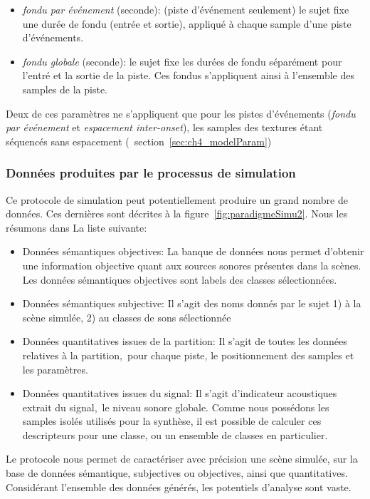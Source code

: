 \begin{itemize}
\item \emph{fondu par événement} (seconde): (piste d'événement seulement) le sujet fixe une durée de fondu (entrée et sortie), appliqué à chaque sample d'une piste d'événements.
\item \emph{fondu globale} (seconde): le sujet fixe les durées de fondu séparément pour l'entré et la sortie de la piste. Ces fondus s'appliquent ainsi à l'ensemble des samples de la piste.
\end{itemize}

Deux de ces paramètres ne s’appliquent que pour les pistes d'événements (\emph{fondu par événement} et \emph{espacement inter-onset}), les samples des textures étant séquencés sans espacement (\cf~section~\ref{sec:ch4_modelParam})

\subsubsection{Données produites par le processus de simulation}

Ce protocole de simulation peut potentiellement produire un grand nombre de données. Ces dernières sont décrites à la figure~\ref{fig:paradigmeSimu2}.  Nous les résumons dans La liste suivante:

\begin{itemize}
\item Données sémantiques objectives: La banque de données nous permet d'obtenir une information objective quant aux sources sonores présentes dans la scènes. Les données sémantiques objectives sont labels des classes sélectionnées.
\item Données sémantiques subjective: Il s'agit des noms donnés par le sujet 1) à la scène simulée, 2) au classes de sons sélectionnée
\item Données quantitatives issues de la partition: Il s'agit de toutes les données relatives à la partition,\ie~pour chaque piste, le positionnement des samples et les paramètres.
\item Données quantitatives issues du signal: Il s'agit d'indicateur acoustiques extrait du signal,\eg~le niveau sonore globale. Comme nous possédons les samples isolés utilisés pour la synthèse, il est possible de calculer ces descripteurs pour une classe, ou un ensemble de classes en particulier.
\end{itemize}

Le protocole nous permet de caractériser avec précision une scène simulée, sur la base de données sémantique, subjectives ou objectives, ainsi que quantitatives. Considérant l'ensemble des données générés, les potentiels d'analyse sont vaste.


